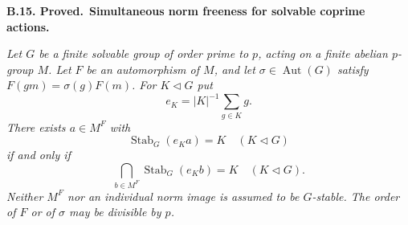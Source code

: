 \documentclass[11pt,a4paper]{article}
\newenvironment{claim}[3]{\par\medskip\noindent\hypertarget{#1}{\textbf{#1. #2.}}\ \textbf{#3.}\par\nopagebreak\smallskip\begingroup\itshape}{\endgroup\par\smallskip}
\begin{document}
\begin{claim}{B.15}{Proved}{Simultaneous norm freeness for solvable coprime actions}
Let $G$ be a finite solvable group of order prime to $p$, acting
on a finite abelian $p$-group $M$. Let $F$ be an automorphism
of $M$, and let $\sigma\in\operatorname{Aut}(G)$ satisfy
$F(gm)=\sigma(g)F(m)$. For $K\triangleleft G$ put
\[
                       e_K=|K|^{-1}\sum_{g\in K}g.
\]
There exists $a\in M^F$ with
\[
                 \operatorname{Stab}_G(e_Ka)=K
                      \quad(K\triangleleft G)                 \tag{B.SV.1}
\]
if and only if
\[
        \bigcap_{b\in M^F}\operatorname{Stab}_G(e_Kb)=K
                      \quad(K\triangleleft G).                \tag{B.SV.2}
\]
Neither $M^F$ nor an individual norm image is assumed to be
$G$-stable. The order of $F$ or of $\sigma$ may be divisible
by $p$.
\end{claim}
\end{document}

